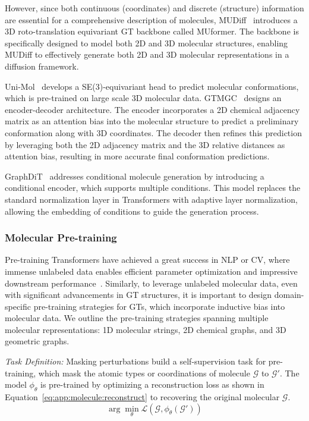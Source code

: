 However, since both continuous (coordinates) and discrete (structure) information are essential for a comprehensive description of molecules, MUDiff~\cite{hua2024mudiff} introduces a 3D roto-translation equivariant GT backbone called MUformer. The backbone is specifically designed to model both 2D and 3D molecular structures, enabling  MUDiff to effectively generate both 2D and 3D molecular representations in a diffusion framework.

Uni-Mol~\cite{zhou2023unimol} develops a SE(3)-equivariant head to predict molecular conformations, which is pre-trained on large scale 3D molecular data.
GTMGC~\cite{xu2024gtmgc} designs an  encoder-decoder architecture. The encoder incorporates a 2D chemical adjacency matrix as an attention bias into the molecular structure to predict a preliminary conformation along with 3D coordinates.
The decoder then refines this prediction by leveraging both the 2D adjacency matrix and the 3D relative distances as attention bias, resulting in more accurate final conformation predictions. 

GraphDiT~\cite{liu2024graph} addresses conditional molecule generation by introducing a conditional encoder, which supports multiple conditions.
This model replaces the standard normalization layer in Transformers with adaptive layer normalization, allowing the embedding of conditions to guide the generation process. 

\subsubsection{\textbf{Molecular Pre-training}}
Pre-training Transformers have achieved  a great success in NLP or CV, where immense unlabeled data enables efficient parameter optimization and impressive downstream performance~\cite{devlin-etal-2019-bert, radford2019language}. 
Similarly, to leverage unlabeled molecular data, even with significant advancements in GT structures, it is important to design domain-specific pre-training strategies for GTs, which incorporate inductive bias into molecular data. We outline the pre-training strategies spanning multiple molecular representations: 1D molecular strings, 2D chemical graphs, and 3D geometric graphs.


\textit{Task Definition:}
Masking perturbations build a self-supervision task for pre-training, which mask the atomic types or coordinations of molecule $\mathcal{G}$ to $\mathcal{G'}$. 
The  model $\phi_\theta$ is pre-trained by optimizing a reconstruction loss as shown in Equation~\eqref{eq:app:molecule:reconstruct} to recovering the original molecular $\mathcal{G}$.
\begin{equation}
    \label{eq:app:molecule:reconstruct}
     \arg \min_{\theta} \mathcal{L}(\mathcal{G}, \phi_\theta(\mathcal{G'}))
\end{equation}

